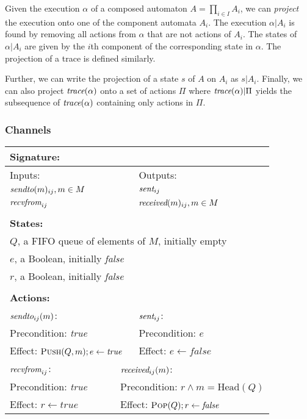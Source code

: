 Given the execution $\alpha$ of a composed automaton $A = \prod_{i \in I} A_i$,
we can \textit{project} the execution onto one of the component automata $A_i$.
The execution $\alpha|A_i$ is found by removing all actions from
$\alpha$ that are not actions of $A_i$. The states of $\alpha|A_i$ are
given by the $i$th component of the corresponding state in $\alpha$. The
projection of a trace is defined similarly.

Further, we can write the projection of a state $s$ of $A$ on $A_i$ as $s|A_i$. 
Finally, we can also project $\operatorname*{\textit{trace}}(\alpha)$ onto a set of actions $\Pi$ where
$\operatorname*{\textit{trace}}(\alpha)|\Pi$ yields the subsequence of $\operatorname*{\textit{trace}}(\alpha)$ containing only actions in $\Pi$.

\subsubsection{Channels}
\label{sec:equivalence:preliminaries:channels}

\begin{table}[!t]
  \centering
  \begin{tabular}{l l l}
    \multicolumn{3}{l}{\textbf{Signature:}} \\ \hline
    Inputs: & & Outputs: \\
    $\operatorname*{\operatorname*{\textit{sendto}}}(m)_{ij}, m \in M$ & & $\operatorname*{\textit{sent}}_{ij}$ \\
    $\operatorname*{\operatorname*{\textit{recvfrom}}}_{ij}$ & & $\operatorname*{\textit{received}}(m)_{ij}, m \in M$ \\ \hline
    \\
    \multicolumn{3}{l}{\textbf{States:}} \\ \hline
    \multicolumn{3}{l}{$Q$, a FIFO queue of elements of $M$, initially empty} \\
    \multicolumn{3}{l}{$e$, a Boolean, initially \textit{false}} \\
    \multicolumn{3}{l}{$r$, a Boolean, initially \textit{false}} \\ \hline
    \\
    \multicolumn{3}{l}{\textbf{Actions:}} \\ \hline
    \multicolumn{2}{l|}{$\operatorname*{\operatorname*{\textit{sendto}}}_{ij}(m)$:} & $\operatorname*{\textit{sent}}_{ij}$: \\
    \multicolumn{2}{l|}{Precondition: \textit{true}} & Precondition: $e$ \\
    \multicolumn{2}{l|}{Effect: $\textsc{Push}(Q,m); e \gets \textit{true}$} & Effect: $e \gets \textit{false}$ \\
    \hline \hline
    $\operatorname*{\operatorname*{\textit{recvfrom}}}_{ij}$: & \multicolumn{2}{|l}{$\operatorname*{\textit{received}}_{ij}(m)$:} \\
    Precondition: \textit{true} & \multicolumn{2}{|l}{Precondition: $r \land m = \text{Head}(Q)$} \\
    Effect: $r \gets \textit{true}$ & \multicolumn{2}{|l}{Effect: $\textsc{Pop}(Q); r \gets \textit{false}$} \\ \hline
  \end{tabular}
  \label{fig:buffered-channel-ioa}
\end{table}

